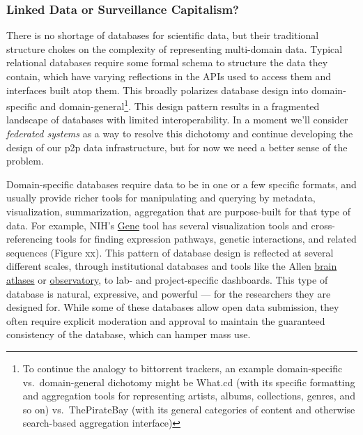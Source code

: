 \documentclass[11pt]{article}
\begin{document}
\hypertarget{linked-data-or-surveillance-capitalism}{%
\subsubsection{Linked Data or Surveillance
Capitalism?}\label{linked-data-or-surveillance-capitalism}}


\begin{multicols}{2}
 There is no shortage of databases for scientific data, but
their traditional structure chokes on the complexity of representing
multi-domain data. Typical relational databases require some formal
schema to structure the data they contain, which have varying
reflections in the APIs used to access them and interfaces built atop
them. This broadly polarizes database design into domain-specific and
domain-general\footnote{To continue the analogy to bittorrent trackers,
  an example domain-specific vs.~domain-general dichotomy might be
  What.cd (with its specific formatting and aggregation tools for
  representing artists, albums, collections, genres, and so on)
  vs.~ThePirateBay (with its general categories of content and otherwise
  search-based aggregation interface)}. This design pattern results in a
fragmented landscape of databases with limited interoperability. In a
moment we'll consider \emph{federated systems} as a way to resolve this
dichotomy and continue developing the design of our p2p data
infrastructure, but for now we need a better sense of the problem.

Domain-specific databases require data to be in one or a few specific
formats, and usually provide richer tools for manipulating and querying
by metadata, visualization, summarization, aggregation that are
purpose-built for that type of data. For example, NIH's
\href{https://www.ncbi.nlm.nih.gov/gene/12550}{Gene} tool has several
visualization tools and cross-referencing tools for finding expression
pathways, genetic interactions, and related sequences (Figure xx). This
pattern of database design is reflected at several different scales,
through institutional databases and tools like the Allen
\href{https://connectivity.brain-map.org/}{brain atlases} or
\href{http://observatory.brain-map.org/visualcoding/}{observatory}, to
lab- and project-specific dashboards. This type of database is natural,
expressive, and powerful --- for the researchers they are designed for.
While some of these databases allow open data submission, they often
require explicit moderation and approval to maintain the guaranteed
consistency of the database, which can hamper mass use.


\end{multicols}
\end{document}
